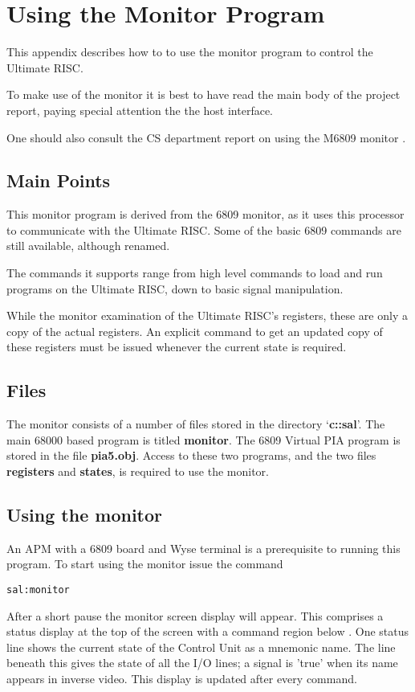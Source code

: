 \chapter{Using the Monitor Program}

This appendix describes how to to use the monitor program to control the Ultimate RISC.

To make use of the monitor it is best to have read the main body of the project report, paying special attention the the host interface.

One should also consult the CS department report on using the M6809 monitor \cite{cs2:mon}.

\section{Main Points}
This monitor program is derived from the 6809 monitor, as it uses this processor to communicate with the Ultimate RISC.
Some of the basic 6809 commands are still available, although  renamed.

The commands it supports range from high level commands to load and run programs on the Ultimate RISC, down to basic signal manipulation.

While the monitor  examination of the Ultimate RISC's registers, these
are only a copy of the actual registers.
An explicit command to get an updated copy of these registers must be issued whenever the current state is required.

\section{Files}

The monitor consists of a number of files stored in the directory `{\bf c::sal}'.
The main 68000 based program is titled {\bf monitor}.
The 6809 Virtual PIA program is stored in the file {\bf pia5.obj}.
Access to these two programs, and the two files {\bf registers} and {\bf states},
is required to use the monitor.

\section{Using the monitor}

An APM with a 6809 board  and Wyse terminal  is a prerequisite to running this program.
To start using the monitor issue the command
\begin{verbatim}
sal:monitor
\end{verbatim}
After a short pause the monitor screen display will appear.
This comprises a status display at the top of the screen with a command region below .
One status line shows the current state of the Control Unit as a mnemonic name.
The line beneath this gives the state of all the I/O lines; a signal is 'true' when its name appears in inverse video.
This display is updated after every command.

